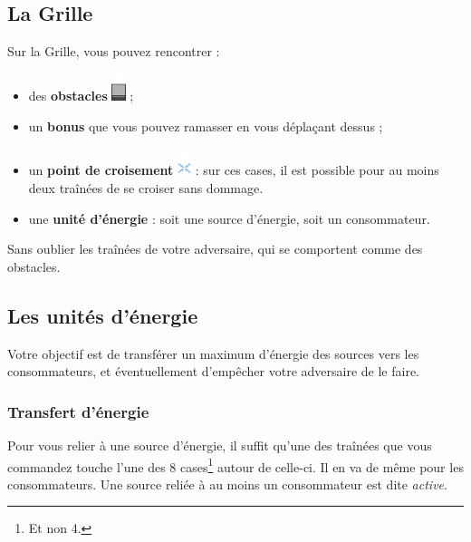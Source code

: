 \subsection{La Grille}


Sur la Grille, vous pouvez rencontrer :

\begin{itemize}
  \item des \textbf{obstacles} \includegraphics[width=4mm]{../data/graphics/terrain-obstacle.png} ;
  \item un \textbf{bonus} que vous pouvez ramasser en vous déplaçant dessus ;
  \item un \textbf{point de croisement} \includegraphics[width=4mm]{../data/graphics/terrain-point_croisement.png} : sur ces cases, il est
    possible pour au moins deux traînées de se croiser sans dommage.
  \item une \textbf{unité d'énergie} : soit une
    source d'énergie, soit un consommateur.
\end{itemize}

Sans oublier les traînées de votre adversaire, qui se comportent comme des obstacles.

\subsection{Les unités d'énergie}

Votre objectif est de transférer un maximum
d'énergie des sources vers les consommateurs, et éventuellement d'empêcher votre
adversaire de le faire.

\subsubsection{Transfert d'énergie}

Pour vous relier à une source d'énergie, il suffit qu'une des traînées que vous commandez touche l'une des 8 cases\footnote{Et non 4.} autour de celle-ci. Il en va de même pour les consommateurs. Une source reliée à au moins un consommateur est dite \emph{active}.

